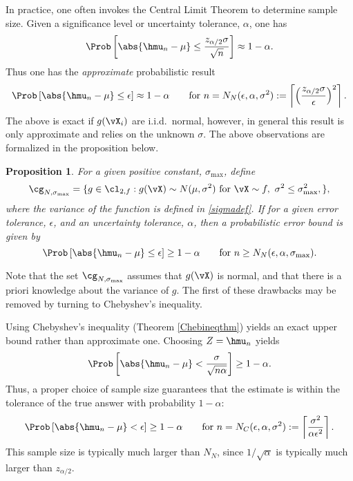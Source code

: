 \documentclass[12pt]{amsart}
\newtheorem{prop}[theorem]{Proposition}
\begin{document}
In practice, one often invokes the Central Limit Theorem to determine sample size. Given a significance level or uncertainty tolerance, $\alpha$, one has 
\[
\Prob\left[\abs{\hmu_n-\mu} \le \frac{z_{\alpha/2} \sigma}{\sqrt{n}} \right] \approx 1-\alpha.
\]
Thus one has the \emph{approximate} probabilistic result
\begin{equation} \label{CLTerr}
\Prob\left[\abs{\hmu_n-\mu} \le \epsilon \right] \approx 1-\alpha \qquad \text{for } n=N_{N}(\epsilon,\alpha,\sigma^2) :=\left \lceil \left(\frac{z_{\alpha/2}\sigma}{\epsilon}\right)^2 \right \rceil.
\end{equation}
The above is exact if $g(\vX_i)$ are i.i.d.\ normal, however, in general this result is only approximate and relies on the unknown $\sigma$.  The above observations are formalized in the proposition below.

\begin{prop}  For a given positive constant, $\sigma_{\max}$, define
\[
\cg_{N,\sigma_{\max}}= \{g \in \cl_{2,f} : g(\vX) \sim N(\mu,\sigma^2) \text{ for }\vX \sim f, \ \sigma^2 \le \sigma^2_{\max}, \},
\]
where the variance of the function is defined in \eqref{sigmadef}.  If for a given error tolerance, $\epsilon$, and an uncertainty tolerance, $\alpha$, then a probabilistic error bound is given by 
\[
\Prob\left[\abs{\hmu_n-\mu} \le \epsilon \right] \ge 1-\alpha \qquad \text{for } n \ge N_{N}(\epsilon,\alpha,\sigma_{\max}).
\]
\end{prop}

Note that the set $\cg_{N,\sigma_{\max}}$ assumes that $g(\vX)$ is normal, and that there is a priori knowledge about the variance of $g$.  The first of these drawbacks may be removed by turning to Chebyshev's inequality.

Using Chebyshev's inequality (Theorem \ref{Chebineqthm}) yields an exact upper bound rather than approximate one.  Choosing $Z=\hmu_n$ yields
\[
\Prob\left[\abs{\hmu_n-\mu} < \frac{\sigma}{\sqrt{n \alpha}} \right] \ge 1-\alpha.
\]
Thus, a proper choice of sample size guarantees that the estimate is within the tolerance of the true answer with probability $1-\alpha$:
\begin{equation} \label{Cheberr}
\Prob\left[\abs{\hmu_n-\mu} < \epsilon \right] \ge 1-\alpha \qquad \text{for } n= N_C(\epsilon,\alpha,\sigma^2):= \left \lceil \frac{\sigma^2}{\alpha\epsilon^2} \right \rceil.
\end{equation}
This sample size is typically much larger than $N_N$, since $1/\sqrt{\alpha}$ is typically much larger than $z_{\alpha/2}$.
\end{document}
